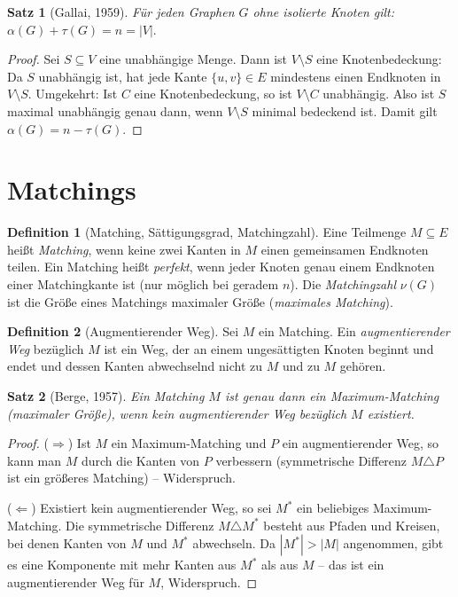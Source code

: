 ﻿\documentclass[a4paper,12pt,openany,oneside]{book}
\theoremstyle{definition}
\newtheorem{definition}{Definition}[chapter]
\theoremstyle{plain}
\newtheorem{satz}{Satz}[chapter]
\theoremstyle{remark}
\begin{document}
\begin{satz}[Gallai, 1959]
  F\"ur jeden Graphen $G$ ohne isolierte Knoten gilt:
  $\alpha(G) + \tau(G) = n = |V|.$
\end{satz}

\begin{proof}
  Sei $S \subseteq V$ eine unabh\"angige Menge. Dann ist $V \setminus S$
  eine Knotenbedeckung: Da $S$ unabh\"angig ist, hat jede Kante
  $\{u,v\} \in E$ mindestens einen Endknoten in $V \setminus S$.
  Umgekehrt: Ist $C$ eine Knotenbedeckung, so ist $V \setminus C$
  unabh\"angig. Also ist $S$ maximal unabh\"angig genau dann, wenn
  $V \setminus S$ minimal bedeckend ist. Damit gilt
  $\alpha(G) = n - \tau(G)$.
\end{proof}

\section{Matchings}

\begin{definition}[Matching, S\"attigungsgrad, Matchingzahl]
  Eine Teilmenge $M \subseteq E$ hei\ss{}t \emph{Matching}, wenn keine zwei
  Kanten in $M$ einen gemeinsamen Endknoten teilen. Ein Matching
  hei\ss{}t \emph{perfekt}, wenn jeder Knoten genau einem Endknoten einer
  Matchingkante ist (nur m\"oglich bei geradem $n$). Die
  \emph{Matchingzahl} $\nu(G)$ ist die Gr\"o\ss{}e eines Matchings
  maximaler Gr\"o\ss{}e (\emph{maximales Matching}).
\end{definition}

\begin{definition}[Augmentierender Weg]
  Sei $M$ ein Matching. Ein \emph{augmentierender Weg} bez\"uglich $M$ ist
  ein Weg, der an einem unges\"attigten Knoten beginnt und endet und dessen
  Kanten abwechselnd nicht zu $M$ und zu $M$ geh\"oren.
\end{definition}

\begin{satz}[Berge, 1957]
  Ein Matching $M$ ist genau dann ein Maximum-Matching (maximaler Gr\"o\ss{}e),
  wenn kein augmentierender Weg bez\"uglich $M$ existiert.
\end{satz}

\begin{proof}
  ($\Rightarrow$) Ist $M$ ein Maximum-Matching und $P$ ein augmentierender
  Weg, so kann man $M$ durch die Kanten von $P$ verbessern (symmetrische
  Differenz $M \triangle P$ ist ein gr\"o\ss{}eres Matching) -- Widerspruch.

  ($\Leftarrow$) Existiert kein augmentierender Weg, so sei $M^*$ ein
  beliebiges Maximum-Matching. Die symmetrische Differenz $M \triangle M^*$
  besteht aus Pfaden und Kreisen, bei denen Kanten von $M$ und $M^*$
  abwechseln. Da $|M^*| > |M|$ angenommen, gibt es eine Komponente mit
  mehr Kanten aus $M^*$ als aus $M$ -- das ist ein augmentierender Weg
  f\"ur $M$, Widerspruch.
\end{proof}
\end{document}
